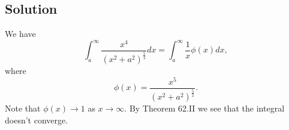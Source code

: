 \subsection*{Solution}

We have
\begin{equation*}
    \int_a^{\infty} \frac{x^4}{(x^2 + a^2)^{\frac{5}{2}}} dx
        = \int_a^{\infty} \frac{1}{x} \phi(x) dx,
\end{equation*}
where
\begin{equation*}
    \phi(x) = \frac{x^5}{(x^2 + a^2)^{\frac{5}{2}}}.
\end{equation*}
Note that $\phi(x) \to 1$ as $x \to \infty$.
By Theorem 62.II we see that the integral doesn't converge.
